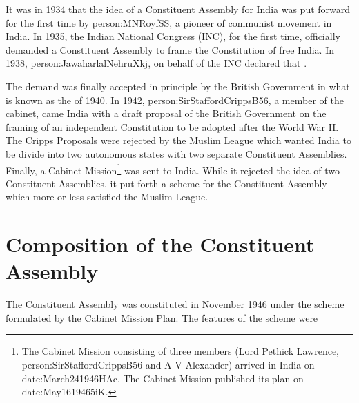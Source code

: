 It was in 1934 that the idea of a Constituent Assembly for India was put forward for the first time by \gls{person:MNRoyfSS}, a pioneer of communist movement in India. In 1935, the Indian National Congress (INC), for the first time, officially demanded a Constituent Assembly to frame the Constitution of free India. In 1938, \gls{person:JawaharlalNehruXkj}, on behalf of the INC declared that .

The demand was finally accepted in principle by the British Government in what is known as the  of 1940. In 1942, \gls{person:SirStaffordCrippsB56}, a member of the cabinet, came India with a draft proposal of the British Government on the framing of an independent Constitution to be adopted after the World War II. The Cripps Proposals were rejected by the Muslim League which wanted India to be divide into two autonomous states with two separate Constituent Assemblies. Finally, a Cabinet Mission\footnote{The Cabinet Mission consisting of three members (Lord Pethick Lawrence, \gls{person:SirStaffordCrippsB56} and A V Alexander) arrived in India on \gls{date:March241946HAc}. The Cabinet Mission published its plan on \gls{date:May1619465iK}.} was sent to India. While it rejected the idea of two Constituent Assemblies, it put forth a scheme for the Constituent Assembly which more or less satisfied the Muslim League.

\section{Composition of the Constituent Assembly}

The Constituent Assembly was constituted in November 1946 under the scheme formulated by the Cabinet Mission Plan. The features of the scheme were

